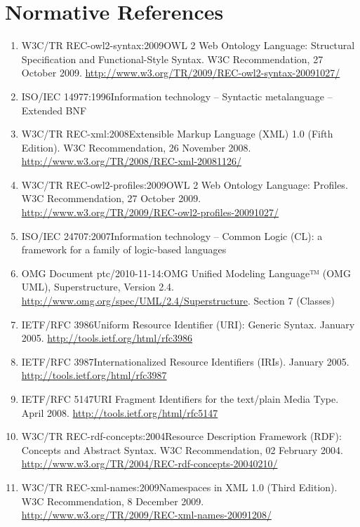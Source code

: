 \documentclass[10pt,%
\ifpretendfinal
final%
\else
draft%
\fi,
]{scrreprt}
\begin{document}
\chapter{Normative References}
\begin{enumerate}
  \item{W3C/TR REC-owl2-syntax:2009}{OWL 2 Web Ontology Language: Structural Specification and Functional-Style Syntax. W3C Recommendation, 27 October 2009. \url{http://www.w3.org/TR/2009/REC-owl2-syntax-20091027/}}
  \item{ISO/IEC 14977:1996}{Information technology – Syntactic metalanguage – Extended BNF}
  \item{W3C/TR REC-xml:2008}{Extensible Markup Language (XML) 1.0 (Fifth Edition). W3C Recommendation, 26 November 2008. \url{http://www.w3.org/TR/2008/REC-xml-20081126/}}
  \item{W3C/TR REC-owl2-profiles:2009}{OWL 2 Web Ontology Language: Profiles. W3C Recommendation, 27 October 2009. \url{http://www.w3.org/TR/2009/REC-owl2-profiles-20091027/}}
  \item{ISO/IEC 24707:2007}{Information technology – Common Logic (CL): a framework for a family of logic-based languages}
  \item{OMG Document ptc/2010-11-14:}{OMG Unified Modeling Language™ (OMG UML), Superstructure, Version 2.4. \url{http://www.omg.org/spec/UML/2.4/Superstructure}. Section 7 (Classes)}
  \item{IETF/RFC 3986}{Uniform Resource Identifier (URI): Generic Syntax. January 2005. \url{http://tools.ietf.org/html/rfc3986}}
  \item{IETF/RFC 3987}{Internationalized Resource Identifiers (IRIs). January 2005. \url{http://tools.ietf.org/html/rfc3987}}
  \item{IETF/RFC 5147}{URI Fragment Identifiers for the text/plain Media Type.  April 2008. \url{http://tools.ietf.org/html/rfc5147}}
  \item{W3C/TR REC-rdf-concepts:2004}{Resource Description Framework (RDF): Concepts and Abstract Syntax.  W3C Recommendation, 02 February 2004.  \url{http://www.w3.org/TR/2004/REC-rdf-concepts-20040210/}}
  \item{W3C/TR REC-xml-names:2009}{Namespaces in XML 1.0 (Third Edition). W3C Recommendation, 8 December 2009. \url{http://www.w3.org/TR/2009/REC-xml-names-20091208/}}

\end{enumerate}
\end{document}
